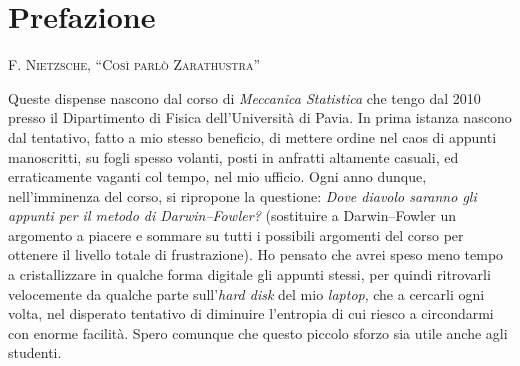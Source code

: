 \pagestyle{empty} %
\tableofcontents %
\cleardoublepage %
\pagestyle{ruled} %


\chapter*{Prefazione}

\begin{minipage}{0.35\textwidth}\end{minipage}\hfill
\begin{minipage}{0.65\textwidth}
\vskip 0.25cm
\textsc{F. Nietzsche, ``Così parlò Zarathustra''}
\end{minipage}
\vskip 1.0cm

Queste dispense nascono dal corso di {\em Meccanica Statistica} che tengo dal 2010 presso il Dipartimento di Fisica dell'Università di Pavia. In prima istanza nascono dal tentativo, fatto a mio stesso beneficio, di mettere ordine nel caos di appunti manoscritti, su fogli spesso volanti, posti in anfratti altamente casuali, ed erraticamente vaganti col tempo, nel mio ufficio. Ogni anno dunque, nell'imminenza del corso, si ripropone la questione: {\em Dove diavolo saranno gli appunti per il metodo di Darwin--Fowler?} (sostituire a Darwin--Fowler un argomento a piacere e sommare su tutti i possibili argomenti del corso per ottenere il livello totale di frustrazione). Ho pensato che avrei speso meno tempo a cristallizzare in qualche forma digitale gli appunti stessi, per quindi ritrovarli velocemente da qualche parte sull'{\em hard disk} del mio {\em laptop}, che a cercarli ogni volta, nel disperato tentativo di diminuire l'entropia di cui riesco a circondarmi con enorme facilità. Spero comunque che questo piccolo sforzo sia utile anche agli studenti.

